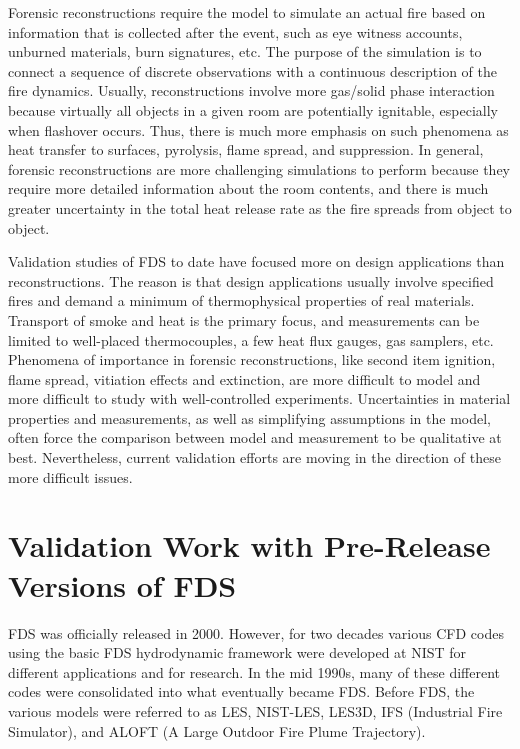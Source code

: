 Forensic reconstructions require the  model to simulate an actual fire based on  information that is collected  after the event,  such as eye witness
accounts, unburned materials,  burn signatures, etc. The purpose  of  the simulation  is  to  connect  a sequence  of  discrete observations
with  a continuous  description  of  the fire  dynamics. Usually,  reconstructions  involve  more gas/solid  phase  interaction because  virtually
all  objects  in  a  given  room  are  potentially ignitable, especially when flashover  occurs. Thus, there is much more emphasis on  such phenomena
as  heat transfer to  surfaces, pyrolysis, flame  spread, and suppression.  In general,  forensic reconstructions are more challenging simulations
to perform because they require more detailed  information  about the  room  contents,  and  there is  much greater uncertainty in the total heat
release rate as the fire spreads from object to object.

Validation  studies  of FDS  to  date  have  focused more  on  design applications   than  reconstructions.  The   reason  is   that  design
applications usually involve specified  fires and demand a minimum of thermophysical properties  of real materials.  Transport  of smoke and heat is
the  primary  focus,  and measurements  can  be  limited  to well-placed thermocouples, a few  heat flux gauges, gas samplers, etc. Phenomena
of importance in forensic reconstructions, like second item  ignition, flame  spread, vitiation  effects and  extinction, are more difficult  to
model  and   more  difficult   to   study  with well-controlled experiments. Uncertainties  in material properties and measurements, as well as
simplifying assumptions in  the model, often force the  comparison between model and measurement  to be qualitative at best.  Nevertheless, current
validation  efforts are moving  in the direction of these more difficult issues.



\section{Validation Work with Pre-Release Versions of FDS}

FDS was officially released in  2000. However, for two decades various CFD codes using the basic FDS hydrodynamic framework were developed at NIST for  different applications and  for research. In the  mid 1990s, many of  these different codes were consolidated  into what eventually became FDS. Before FDS, the various  models were referred  to as LES, NIST-LES, LES3D,  IFS (Industrial Fire Simulator), and  ALOFT (A Large Outdoor Fire Plume Trajectory).

